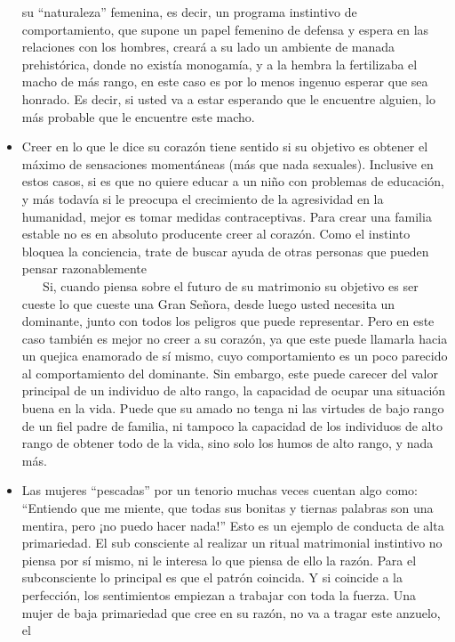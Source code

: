 \begin{itemize}
  su ``naturaleza'' femenina, es decir, un programa instintivo de
  comportamiento, que supone un papel femenino de defensa y espera en
  las relaciones con los hombres, creará a su lado un ambiente de manada
  prehistórica, donde no existía monogamía, y a la hembra la fertilizaba
  el macho de más rango, en este caso es por lo menos ingenuo esperar
  que sea honrado. Es decir, si usted va a estar esperando que le
  encuentre alguien, lo más probable que le encuentre este macho.
\item
  Creer en lo que le dice su corazón tiene sentido si su objetivo es
  obtener el máximo de sensaciones momentáneas (más que nada sexuales).
  Inclusive en estos casos, si es que no quiere educar a un niño con
  problemas de educación, y más todavía si le preocupa el crecimiento de
  la agresividad en la humanidad, mejor es tomar medidas contraceptivas.
  Para crear una familia estable no es en absoluto producente creer al
  corazón. Como el instinto bloquea la conciencia, trate de buscar ayuda
  de otras personas que pueden pensar razonablemente\\
  \hspace*{0.333em} ~ ~ Si, cuando piensa sobre el futuro de su
  matrimonio su objetivo es ser cueste lo que cueste una Gran Señora,
  desde luego usted necesita un dominante, junto con todos los peligros
  que puede representar. Pero en este caso también es mejor no creer a
  su corazón, ya que este puede llamarla hacia un quejica enamorado de
  sí mismo, cuyo comportamiento es un poco parecido al comportamiento
  del dominante. Sin embargo, este puede carecer del valor principal de
  un individuo de alto rango, la capacidad de ocupar una situación buena
  en la vida. Puede que su amado no tenga ni las virtudes de bajo rango
  de un fiel padre de familia, ni tampoco la capacidad de los individuos
  de alto rango de obtener todo de la vida, sino solo los humos de alto
  rango, y nada más.
\item
  Las mujeres ``pescadas'' por un tenorio muchas veces cuentan algo
  como: ``Entiendo que me miente, que todas sus bonitas y tiernas
  palabras son una mentira, pero ¡no puedo hacer nada!'' Esto es un
  ejemplo de conducta de alta primariedad. El sub consciente al realizar
  un ritual matrimonial instintivo no piensa por sí mismo, ni le
  interesa lo que piensa de ello la razón. Para el subconsciente lo
  principal es que el patrón coincida. Y si coincide a la perfección,
  los sentimientos empiezan a trabajar con toda la fuerza. Una mujer de
  baja primariedad que cree en su razón, no va a tragar este anzuelo, el

\end{itemize}
